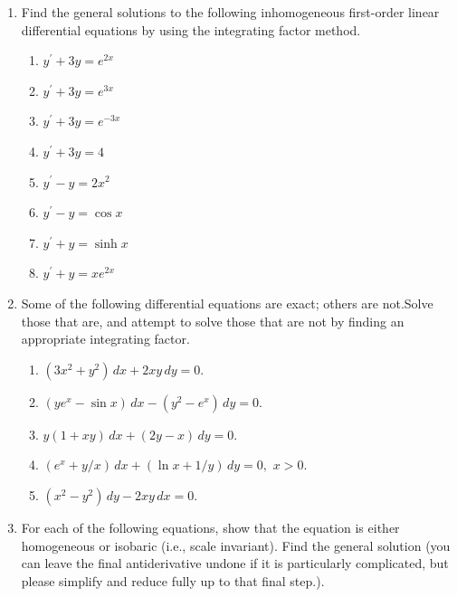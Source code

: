 \documentclass[fleqn]{article}
\begin{document}
  \begin{enumerate}


    \item Find the general solutions to the following inhomogeneous first-order linear differential equations by using the integrating factor method. 
    
    \begin{enumerate}
      \item $y^{\prime}+3y=e^{2x}$
      
      \item $y^{\prime}+3y=e^{3x}$
      
      \item $y^{\prime}+3y=e^{-3x}$
      
      \item $y^{\prime}+3y=4$
      
      \item $y^{\prime}-y=2x^{2}$
      
      \item $y^{\prime}-y=\cos x$
      
      \item $y^{\prime}+y=\sinh x$
      
      \item $y^{\prime}+y=xe^{2x}$
    \end{enumerate}
    
    \item Some of the following differential equations are exact; others are not.Solve those that are, and attempt to solve those that are not by finding an appropriate integrating factor.
    
    \begin{enumerate}
      \item $(3x^{2}+y^{2})\,dx+2xy\,dy=0$.
      
      \item $\left( ye^{x}-\sin x\right) \,dx-\left( y^{2}-e^{x}\right) \,dy=0$.
      
      \item $y\left( 1+xy\right) \,dx+\left( 2y-x\right) \,dy=0$.
      
      \item $\left( e^{x}+y/x\right) \,dx+\left( \ln x+1/y\right) \,dy=0,$ $x>0$.
      
      \item $\left( x^{2}-y^{2}\right) \,dy-2xy\,dx=0.$
    \end{enumerate}
    
    
    \item  For each of the following equations, show that the equation is either homogeneous or isobaric (i.e., scale invariant). Find the general solution (you can leave the final antiderivative undone if it is particularly complicated, but please simplify and reduce fully up to that final step.). 
    

\end{enumerate}
\end{document}
